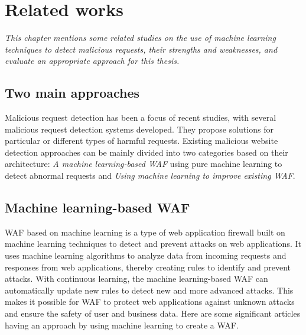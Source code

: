 \chapter{Related works}
\label{chap:literaturereview}
	\textit{\hspace{0.5cm}This chapter mentions some related studies on the use of machine learning techniques to detect malicious requests, their strengths and weaknesses, and evaluate an appropriate approach for this thesis.}
\minitoc
\newpage	
\section{Two main approaches}
Malicious request detection has been a focus of recent studies, with several malicious request detection systems developed. They propose solutions for particular or different types of harmful requests. Existing malicious website detection approaches can be mainly divided into two categories based on their architecture: \emph{A machine learning-based WAF} using pure machine learning to detect abnormal requests and \emph{Using machine learning to improve existing WAF}.


\section{Machine learning-based WAF}
\label{sec:machine_learning_based}
\hspace{0.5cm}WAF based on machine learning is a type of web application firewall built on machine learning techniques to detect and prevent attacks on web applications. It uses machine learning algorithms to analyze data from incoming requests and responses from web applications, thereby creating rules to identify and prevent attacks.
With continuous learning, the machine learning-based WAF can automatically update new rules to detect new and more advanced attacks. This makes it possible for WAF to protect web applications against unknown attacks and ensure the safety of user and business data. Here are some significant articles having an approach by using machine learning to create a WAF. 

